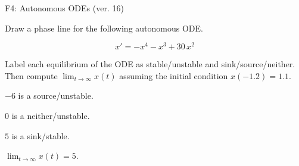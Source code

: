 \begin{exercise}
  \begin{exerciseTitle}F4: Autonomous ODEs (ver. 16)\end{exerciseTitle}
  \begin{exerciseStatement}
    

      Draw a phase line for the following 
      autonomous ODE.
    

    
\[x'= -x^{4} - x^{3} + 30 \, x^{2}\]

    

      Label each equilibrium of the ODE
      as stable/unstable and sink/source/neither.
      Then compute \(\lim_{t\to\infty}x(t)\)
      assuming the initial condition
      \(x( -1.2 )= 1.1\).
    

  \end{exerciseStatement}
  \begin{exerciseAnswer}
    

      \(-6\) is a source/unstable.
      
        \(0\) is a neither/unstable.
      
      \(5\) is a sink/stable.
    

    

      \(\lim_{t\to\infty}x(t)=5\).
    

  \end{exerciseAnswer}
\end{exercise}